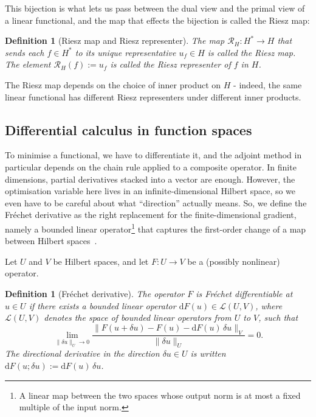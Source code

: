 \documentclass[a4paper,11pt]{article}
\newcommand{\Rmap}{\mathcal{R}}              %
\theoremstyle{spacedplain} \newtheorem{theorem}[counter]{Theorem} \newtheorem{lemma}[counter]{Lemma} \newtheorem{prop}[counter]{Proposition} \newtheorem{cor}[counter]{Corollary}
\theoremstyle{spaceddefinition} \newtheorem{defn}[counter]{Definition} \newtheorem{example}[counter]{Example} \newtheorem{remark}[counter]{Remark}
\begin{document}
This bijection is what lets us pass between the dual view and the primal view of a linear functional, and the map that effects the bijection is called the Riesz map:

\begin{defn}[Riesz map and Riesz representer]
\label{defn:rieszmap} The map $\Rmap_H : H^{*} \to H$ that sends each $f \in H^{*}$ to its unique representative $u_f \in H$ is called the \emph{Riesz map}. The element $\Rmap_H(f) := u_f$ is called the \emph{Riesz representer} of $f$ in $H$.
\end{defn}

The Riesz map depends on the choice of inner product on $H$ - indeed, the same linear functional has different Riesz representers under different inner products. 

\subsection{Differential calculus in function spaces}
\label{sec:prelim:frechet}

To minimise a functional, we have to differentiate it, and the adjoint method in particular depends on the chain rule applied to a composite operator. In finite dimensions, partial derivatives stacked into a vector are enough. However, the optimisation variable here lives in an infinite-dimensional Hilbert space, so we even have to be careful about what ``direction'' actually means. So, we define the Fr{\'e}chet derivative as the right replacement for the finite-dimensional gradient, namely a bounded linear operator\footnote{A linear map between the two spaces whose output norm is at most a fixed multiple of the input norm.} that captures the first-order change of a map between Hilbert spaces~\citep[Sect.~1.2.2--1.2.3]{shfp2017}.

Let $U$ and $V$ be Hilbert spaces, and let $F : U \to V$ be a (possibly nonlinear) operator.

\begin{defn}[Fr{\'e}chet derivative]
\label{defn:frechet} The operator $F$ is \emph{Fr{\'e}chet differentiable} at $u \in U$ if there exists a bounded linear operator $\mathrm{d} F(u) \in \mathcal{L}(U, V)$, where $\mathcal{L}(U, V)$ denotes the space of bounded linear operators from $U$ to $V$, such that
\begin{equation}
  \lim_{\|\delta u\|_U \to 0}
    \frac{\|F(u + \delta u) - F(u) - \mathrm{d} F(u)\, \delta u\|_V}
         {\|\delta u\|_U}
  = 0.
\end{equation}
The directional derivative in the direction $\delta u \in U$ is written $\mathrm{d} F(u; \delta u) := \mathrm{d} F(u)\, \delta u$.
\end{defn}
\end{document}
